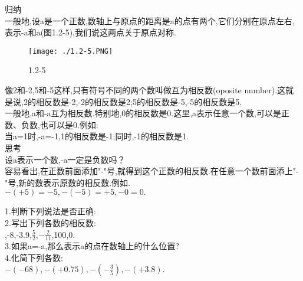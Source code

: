 \documentclass{article}
\begin{document}
	归纳\\
	\indent 一般地,设a是一个正数,数轴上与原点的距离是a的点有两个,它们分别在原点左右,表示-a和a(图1.2-5),我们说这两点关于原点对称.\\
	\begin{figure}[ht!]
		\centering
		\texttt{[image: ./1.2-5.PNG]}
		\caption{1.2-5}
	\end{figure}
	\indent 像2和-2,5和-5这样,只有符号不同的两个数叫做互为相反数(oposite number).这就是说,2的相反数是-2,-2的相反数是2;5的相反数是-5,-5的相反数是5.\\
	\indent 一般地,a和-a互为相反数.特别地,0的相反数是0.这里,a表示任意一个数,可以是正数、负数,也可以是0.例如:\\
	\indent 当a=1时,-a=-1,1的相反数是-1;同时,-1的相反数是1.\\
	思考\\
	\indent 设a表示一个数,-a一定是负数吗？\\
	\indent 容易看出,在正数前面添加"-"号,就得到这个正数的相反数.在任意一个数前面添上"-"号,新的数表示原数的相反数.例如.\\
	\indent $-(+5)=-5, -(-5)=+5, -0=0.$\\
	\begin{exercise}
		1.判断下列说法是否正确:\\	
		\newcommand{\fourch}[4]{
			\indent\makebox[262pt][l]{\qquad(A) #1}\\
			\indent\makebox[262pt][l]{\qquad(B) #2}\\
			\indent\makebox[262pt][l]{\qquad(C) #3}\\
			\indent\makebox[262pt][l]{\qquad(D) #4}\\}
		2.写出下列各数的相反数:\\
		,-8,-3.9,$\frac{5}{2}$,$-\frac{2}{11}$,100,0.\\
		3.如果a=-a,那么表示a的点在数轴上的什么位置?\\
		4.化简下列各数:\\
		\indent $-(-68),-(+0.75),-(-\frac{3}{5}),-(+3.8).$\\
	\end{exercise}	
\end{document}
